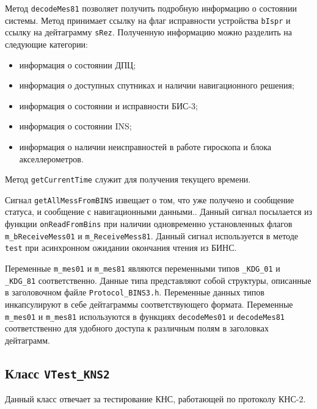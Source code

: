 \begin{enum}
	\item Метод \texttt{decodeMes81} позволяет получить подробную информацию о состоянии системы. Метод принимает
		ссылку на флаг исправности устройства \texttt{bIspr} и ссылку на дейтаграмму \texttt{sRez}. Полученную
		информацию можно разделить на следующие категории:
		\begin{itemize}
				\item информация о состоянии ДПЦ;
				\item информация о доступных спутниках и наличии навигационного решения;
				\item информация о состоянии и исправности БИС-3;
				\item информация о состоянии INS;
				\item информация о наличии неисправностей в работе гироскопа и блока акселлерометров.
		\end{itemize}

	\item Метод \texttt{getCurrentTime} служит для получения текущего времени.

	\item Сигнал \texttt{getAllMessFromBINS} извещает о том, что уже получено и сообщение статуса, и сообщение с
		навигационными данными.. Данный сигнал посылается из функции \texttt{onReadFromBins} при наличии
		одновременно установленных флагов
		\texttt{m\_bReceiveMess01} и \texttt{m\_ReceiveMess81}. Данный сигнал используется в методе
		\texttt{test} при асинхронном ожидании окончания чтения из БИНС.

	\item Переменные \texttt{m\_mes01} и \texttt{m\_mes81} являются переменными типов \texttt{\_KDG\_01} и
		\texttt{\_KDG\_81} соответственно. Данные типа представляют собой структуры, описанные в заголовочном
		файле \texttt{Protocol\_BINS3.h}. Переменные данных типов инкапсулируют в себе дейтаграммы
		соответствующего формата. Переменные \texttt{m\_mes01} и \texttt{m\_mes81} используются в функциях
		\texttt{decodeMes01} и \texttt{decodeMes81} соответственно для удобного доступа к различным полям в
		заголовках дейтаграмм.
\end{enum}

\subsection{Класс \texttt{VTest\_KNS2}}
Данный класс отвечает за тестирование КНС, работающей по протоколу КНС-2.

